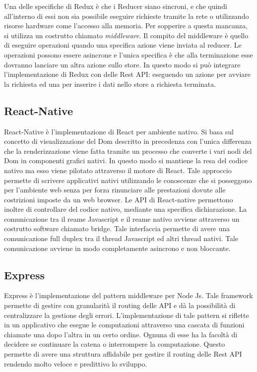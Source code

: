 	Una delle specifiche di Redux è che i Reducer siano sincroni, e che quindi all'interno di essi non sia possibile eseguire richieste tramite la rete o utilizzando risorse hardware come l'accesso alla memoria. Per sopperire a questa mancanza, si utilizza un costrutto chiamato \emph{middleware}. Il compito del middleware è quello di eseguire operazioni quando una specifica azione viene inviata al reducer. Le operazioni possono essere asincrone e l'unica specifica è che alla terminazione esse dovranno lanciare un altra azione sullo store. In questo modo si può integrare l'implementazione di Redux con delle Rest API: eseguendo un azione per avviare la richiesta ed una per inserire i dati nello store a richiesta terminata.\vspace{5mm}
	
\subsection{React-Native}\vspace{5mm}

	React-Native è l'implementazione di React per ambiente nativo. Si basa sul concetto di visualizzazione del Dom descritto in precedenza con l'unica differenza che la renderizzazione viene fatta tramite un processo che converte i vari nodi del Dom in componenti grafici nativi. In questo modo si mantiene la resa del codice nativo ma esso viene pilotato attraverso il motore di React. Tale approccio permette di scrivere applicativi nativi utilizzando le conoscenze che si posseggono per l'ambiente web senza per forza rinunciare alle prestazioni dovute alle costrizioni imposte da un web browser. Le API di React-native permettono inoltre di controllare del codice nativo, mediante una specifica dichiarazione. La comunicazione tra il reame Javascript e il reame nativo avviene attraverso un costrutto software chiamato bridge. Tale interfaccia permette di avere una comunicazione full duplex tra il thread Javascript ed altri thread nativi. Tale comunicazione avviene in modo completamente asincrono e non bloccante.\vspace{5mm}

\subsection{Express}\vspace{5mm}

	Express è l'implementazione del pattern middleware per Node Js. Tale framework permette di gestire con granularità il routing delle API e dà la possibilità di centralizzare la gestione degli errori. L'implementazione di tale pattern si riflette in un applicativo che esegue le computazioni attraverso una cascata di funzioni chiamate una dopo l'altra in un certo ordine. Ognuna di esse ha la facoltà di decidere se continuare la catena o interrompere la computazione. Questo permette di avere una struttura affidabile per gestire il routing delle Rest API rendendo molto veloce e predittivo lo sviluppo.\vspace{5mm}

